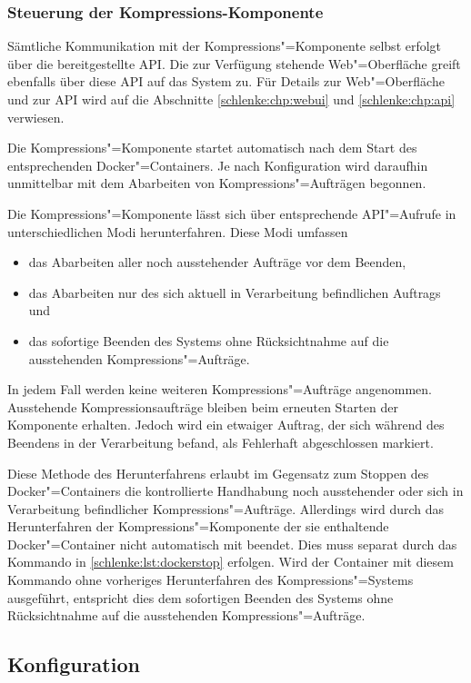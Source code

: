 \subsubsection{Steuerung der Kompressions-Komponente}
\label{schlenke:chp:componentcontrol}

Sämtliche Kommunikation mit der Kompressions"=Komponente selbst erfolgt über die bereitgestellte API. Die zur Verfügung stehende Web"=Oberfläche greift ebenfalls über diese API auf das System zu. Für Details zur Web"=Oberfläche und zur API wird auf die Abschnitte \ref{schlenke:chp:webui} und \ref{schlenke:chp:api} verwiesen.

Die Kompressions"=Komponente startet automatisch nach dem Start des entsprechenden Docker"=Containers. Je nach Konfiguration wird daraufhin unmittelbar mit dem Abarbeiten von Kompressions"=Aufträgen begonnen. 

Die Kompressions"=Komponente lässt sich über entsprechende API"=Aufrufe in unterschiedlichen Modi herunterfahren. Diese Modi umfassen
\begin{itemize}
\item das Abarbeiten aller noch ausstehender Aufträge vor dem Beenden,
\item das Abarbeiten nur des sich aktuell in Verarbeitung befindlichen Auftrags und
\item das sofortige Beenden des Systems ohne Rücksichtnahme auf die ausstehenden Kompressions"=Aufträge.
\end{itemize} 
In jedem Fall werden keine weiteren Kompressions"=Aufträge angenommen. Ausstehende Kompressionsaufträge bleiben beim erneuten Starten der Komponente erhalten. Jedoch wird ein etwaiger Auftrag, der sich während des Beendens in der Verarbeitung befand, als \glqq{}Fehlerhaft abgeschlossen\grqq{} markiert.

Diese Methode des Herunterfahrens erlaubt im Gegensatz zum Stoppen des Docker"=Containers die kontrollierte Handhabung noch ausstehender oder sich in Verarbeitung befindlicher Kompressions"=Aufträge. Allerdings wird durch das Herunterfahren der Kompressions"=Komponente der sie enthaltende Docker"=Container nicht automatisch mit beendet. Dies muss separat durch das Kommando in \autoref{schlenke:lst:dockerstop} erfolgen. Wird der Container mit diesem Kommando ohne vorheriges Herunterfahren des Kompressions"=Systems ausgeführt, entspricht dies dem sofortigen Beenden des Systems ohne Rücksichtnahme auf die ausstehenden Kompressions"=Aufträge.

\subsection{Konfiguration}
\label{schlenke:chp:configuration}

